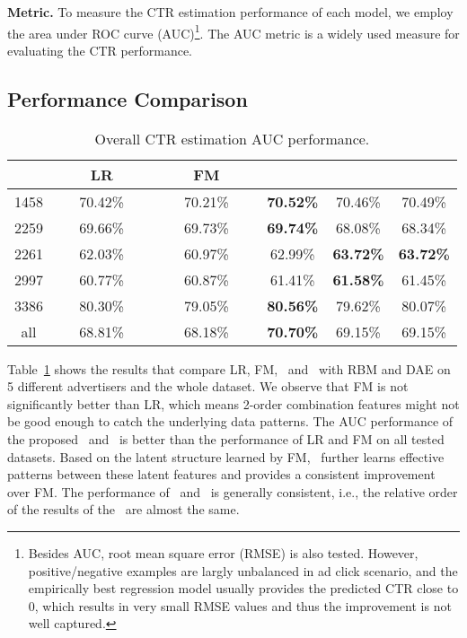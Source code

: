 \documentclass{llncs}
\newcommand{\fmnn}{\text{FNN}}
\newcommand{\snn}{\text{SNN}}
\newcommand{\snnrbm}{\text{SNN-RBM}}
\newcommand{\snndae}{\text{SNN-DAE}}
\begin{document}
\noindent \textbf{Metric.} To measure the CTR estimation performance of each model, we employ the area under ROC curve (AUC)\footnote{Besides AUC, root mean square error (RMSE) is also tested. However, positive/negative examples are largly unbalanced in ad click scenario, and the empirically best regression model usually provides the predicted CTR close to 0, which results in very small RMSE values and thus the improvement is not well captured.}. The AUC \cite{graepel2010web} metric is a widely used measure for evaluating the CTR performance.

\subsection{Performance Comparison}



\begin{table}[t]
\centering
\vspace{-30pt}
\caption{Overall CTR estimation AUC performance.}\label{tab:performance}
\begin{tabular}{c|ccccc}
& ~~~~LR~~~~ & ~~~~FM~~~~ & ~~~\fmnn~~~ & \snndae & \snnrbm\\ \hline
1458 & 70.42\% & 70.21\% & \textbf{70.52\%} & 70.46\% & 70.49\% \\
2259 & 69.66\% & 69.73\% & \textbf{69.74\%} & 68.08\% & 68.34\% \\
2261 & 62.03\% & 60.97\% & 62.99\% & \textbf{63.72\%} & \textbf{63.72\%} \\
2997 & 60.77\% & 60.87\% & 61.41\% & \textbf{61.58\%} & 61.45\% \\
3386 & 80.30\% & 79.05\% & \textbf{80.56\%} & 79.62\% & 80.07\% \\
all  & 68.81\% & 68.18\% & \textbf{70.70\%} & 69.15\% & 69.15\% \\
\end{tabular}
\end{table}

Table~\ref{tab:performance} shows the results that compare LR, FM, \fmnn~and \snn~with RBM and DAE on 5 different advertisers and the whole dataset. We observe that FM is not significantly better than LR, which means 2-order combination features might not be good enough to catch the underlying data patterns. The AUC performance of the proposed \fmnn~and \snn~is better than the performance of LR and FM on all tested datasets. Based on the latent structure learned by FM, \fmnn~further learns effective patterns between these latent features and provides a consistent improvement over FM. The performance of \snndae~and \snnrbm~is generally consistent, i.e., the relative order of the results of the \snn~are almost the same.
\end{document}

